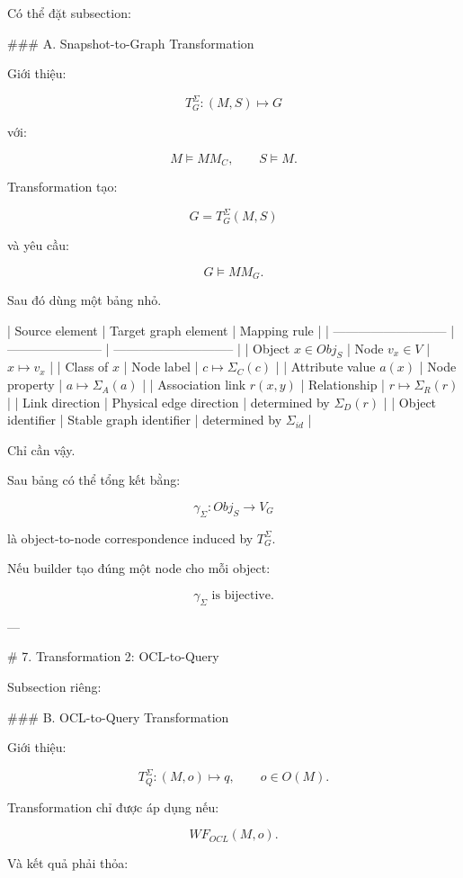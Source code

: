 Có thể đặt subsection:

### A. Snapshot-to-Graph Transformation

Giới thiệu:

$$
\boxed{
T_G^\Sigma:(M,S)\mapsto G
}
\tag{5}
$$

với:

$$
M\models MM_C,
\qquad
S\models M.
$$

Transformation tạo:

$$
\boxed{
G=T_G^\Sigma(M,S)
}
$$

và yêu cầu:

$$
\boxed{
G\models MM_G.
}
\tag{6}
$$

Sau đó dùng một bảng nhỏ.

| Source element              | Target graph element    | Mapping rule                  |
| --------------------------- | ----------------------- | ----------------------------- |
| Object \(x\in Obj_S\)       | Node \(v_x\in V\)       | \(x\mapsto v_x\)              |
| Class of \(x\)              | Node label              | \(c\mapsto\Sigma_C(c)\)       |
| Attribute value \(a(x)\)    | Node property           | \(a\mapsto\Sigma_A(a)\)       |
| Association link \(r(x,y)\) | Relationship            | \(r\mapsto\Sigma_R(r)\)       |
| Link direction              | Physical edge direction | determined by \(\Sigma_D(r)\) |
| Object identifier           | Stable graph identifier | determined by \(\Sigma_{id}\) |

Chỉ cần vậy.

Sau bảng có thể tổng kết bằng:

$$
\boxed{
\gamma_\Sigma:
Obj_S\rightarrow V_G
}
$$

là object-to-node correspondence induced by \(T_G^\Sigma\).

Nếu builder tạo đúng một node cho mỗi object:

$$
\boxed{
\gamma_\Sigma
\text{ is bijective}.
}
\tag{7}
$$

---

# 7. Transformation 2: OCL-to-Query

Subsection riêng:

### B. OCL-to-Query Transformation

Giới thiệu:

$$
\boxed{
T_Q^\Sigma:(M,o)\mapsto q,
\qquad o\in O(M).
}
\tag{8}
$$

Transformation chỉ được áp dụng nếu:

$$
WF_{OCL}(M,o).
$$

Và kết quả phải thỏa:

